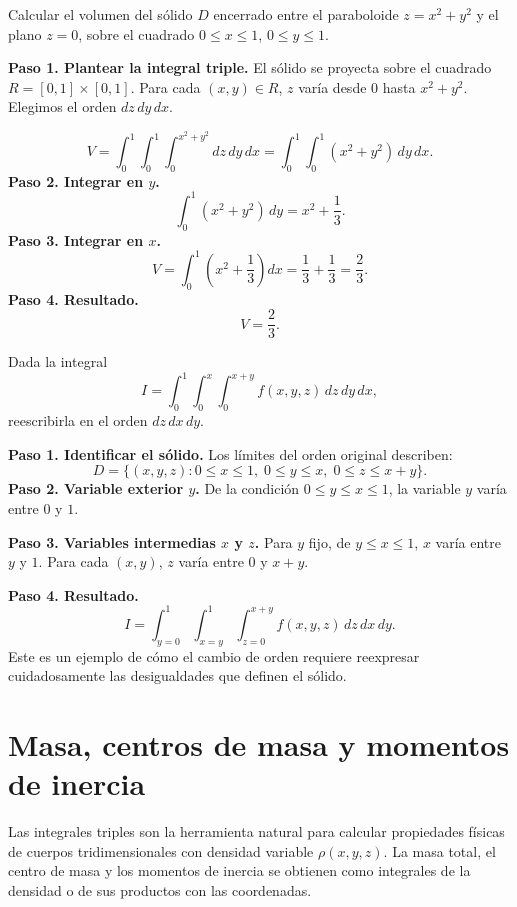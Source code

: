 \begin{example}
Calcular el volumen del sólido \(D\) encerrado entre el paraboloide \(z = x^2 + y^2\) y el plano \(z = 0\), sobre el cuadrado \(0 \le x \le 1\), \(0 \le y \le 1\).
\begin{myproof}
\textbf{Paso 1. Plantear la integral triple.} El sólido se proyecta sobre el cuadrado \(R = [0,1]\times[0,1]\). Para cada \((x,y)\in R\), \(z\) varía desde \(0\) hasta \(x^2+y^2\). Elegimos el orden \(dz\,dy\,dx\).

\[
V = \int_{0}^{1}\int_{0}^{1}\int_{0}^{x^2+y^2} dz\,dy\,dx
= \int_{0}^{1}\int_{0}^{1} (x^2+y^2)\,dy\,dx.
\]
\textbf{Paso 2. Integrar en $y$.}
\[
\int_{0}^{1} (x^2+y^2)\,dy = x^2 + \frac{1}{3}.
\]
\textbf{Paso 3. Integrar en $x$.}
\[
V = \int_{0}^{1} \left(x^2 + \frac{1}{3}\right) dx
= \frac{1}{3} + \frac{1}{3} = \frac{2}{3}.
\]
\textbf{Paso 4. Resultado.}
\[
\boxed{V = \frac{2}{3}.}
\]
\end{myproof}
\end{example}

\begin{example}
Dada la integral
\[
I = \int_{0}^{1}\int_{0}^{x}\int_{0}^{x+y} f(x,y,z)\,dz\,dy\,dx,
\]
reescribirla en el orden \(dz\,dx\,dy\).
\begin{myproof}
\textbf{Paso 1. Identificar el sólido.} Los límites del orden original describen:
\[
D = \{ (x,y,z) : 0 \le x \le 1,\; 0 \le y \le x,\; 0 \le z \le x+y \}.
\]
\textbf{Paso 2. Variable exterior $y$.} De la condición $0\le y\le x\le 1$, la variable $y$ varía entre $0$ y $1$.

\textbf{Paso 3. Variables intermedias $x$ y $z$.} Para $y$ fijo, de $y\le x\le 1$, $x$ varía entre $y$ y $1$. Para cada $(x,y)$, $z$ varía entre $0$ y $x+y$.

\textbf{Paso 4. Resultado.}
\[
\boxed{I = \int_{y=0}^{1}\int_{x=y}^{1}\int_{z=0}^{x+y} f(x,y,z)\,dz\,dx\,dy.}
\]
Este es un ejemplo de cómo el cambio de orden requiere reexpresar cuidadosamente las desigualdades que definen el sólido.
\end{myproof}
\end{example}

\section{Masa, centros de masa y momentos de inercia}

Las integrales triples son la herramienta natural para calcular propiedades físicas de cuerpos tridimensionales con densidad variable \(\rho(x,y,z)\). La masa total, el centro de masa y los momentos de inercia se obtienen como integrales de la densidad o de sus productos con las coordenadas.

